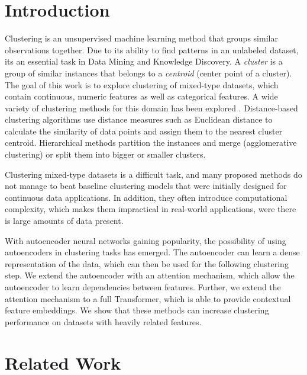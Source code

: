 \chapter{Introduction}

Clustering is an unsupervised machine learning method that groups similar observations together. Due to its ability to find patterns in an unlabeled dataset, its an essential task in Data Mining and Knowledge Discovery. A \textit{cluster} is a group of similar instances that belongs to a \textit{centroid} (center point of a cluster). The goal of this work is to explore clustering of mixed-type datasets, which contain continuous, numeric features as well as categorical features. A wide variety of clustering methods for this domain has been explored \cite{mixed_type_survey_2019}. Distance-based clustering algorithms use distance measures such as Euclidean distance to calculate the similarity of data points and assign them to the nearest cluster centroid. Hierarchical methods partition the instances and merge (agglomerative clustering) or split them into bigger or smaller clusters. 

Clustering mixed-type datasets is a difficult task, and many proposed methods do not manage to beat baseline clustering models that were initially designed for continuous data applications. In addition, they often introduce computational complexity, which makes them impractical in real-world applications, were there is large amounts of data present. 

With autoencoder neural networks gaining popularity, the possibility of using autoencoders in clustering tasks has emerged. The autoencoder can learn a dense representation of the data, which can then be used for the following clustering step. We extend the autoencoder with an attention mechanism, which allow the autoencoder to learn dependencies between features. Further, we extend the attention mechanism to a full Transformer, which is able to provide contextual feature embeddings. We show that these methods can increase clustering performance on datasets with heavily related features.

\chapter{Related Work}

